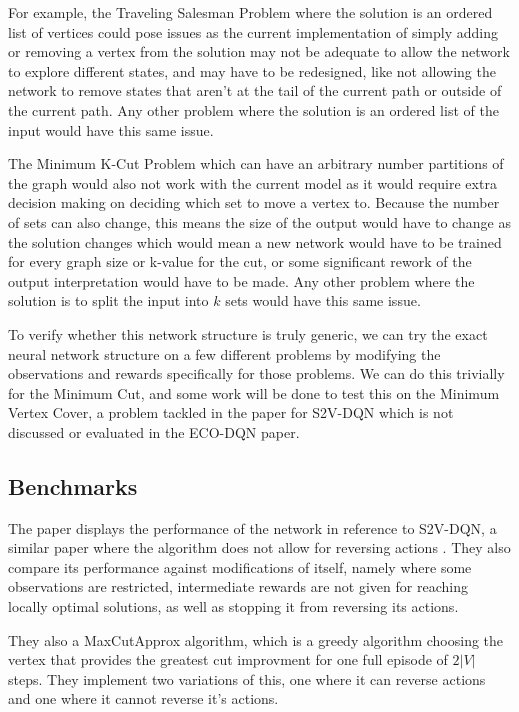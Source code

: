 \documentclass{article}
\begin{document}
For example, the Traveling Salesman Problem where the solution is an ordered list of vertices could pose issues as the current implementation of simply adding or removing a vertex from the solution may not be adequate to allow the network to explore different states, and may have to be redesigned, like not allowing the network to remove states that aren't at the tail of the current path or outside of the current path. Any other problem where the solution is an ordered list of the input would have this same issue.

The Minimum K-Cut Problem which can have an arbitrary number partitions of the graph would also not work with the current model as it would require extra decision making on deciding which set to move a vertex to. Because the number of sets can also change, this means the size of the output would have to change as the solution changes which would mean a new network would have to be trained for every graph size or k-value for the cut, or some significant rework of the output interpretation would have to be made. Any other problem where the solution is to split the input into $k$ sets would have this same issue.

To verify whether this network structure is truly generic, we can try the exact neural network structure on a few different problems by modifying the observations and rewards specifically for those problems. We can do this trivially for the Minimum Cut, and some work will be done to test this on the Minimum Vertex Cover, a problem tackled in the paper for S2V-DQN which is not discussed or evaluated in the ECO-DQN paper.

\subsection{Benchmarks}\label{sec:benchmarks-eco}

The paper displays the performance of the network in reference to S2V-DQN, a similar paper where the algorithm does not allow for reversing actions \cite{s2v-dqn}. They also compare its performance against modifications of itself, namely where some observations are restricted, intermediate rewards are not given for reaching locally optimal solutions, as well as stopping it from reversing its actions. 

They also a MaxCutApprox algorithm, which is a greedy algorithm choosing the vertex that provides the greatest cut improvment for one full episode of $2|V|$ steps. They implement two variations of this, one where it can reverse actions and one where it cannot reverse it's actions. 
\end{document}
